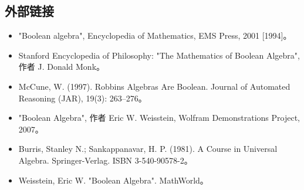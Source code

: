 \subsection{外部链接}
\begin{itemize}
\item "Boolean algebra", Encyclopedia of Mathematics, EMS Press, 2001 [1994]。
\item Stanford Encyclopedia of Philosophy: "The Mathematics of Boolean Algebra", 作者 J. Donald Monk。
\item McCune, W. (1997). Robbins Algebras Are Boolean. Journal of Automated Reasoning (JAR), 19(3): 263–276。
\item "Boolean Algebra", 作者 Eric W. Weisstein, Wolfram Demonstrations Project, 2007。
\item Burris, Stanley N.; Sankappanavar, H. P. (1981). A Course in Universal Algebra. Springer-Verlag. ISBN 3-540-90578-2。
\item Weisstein, Eric W. "Boolean Algebra". MathWorld。
\end{itemize}